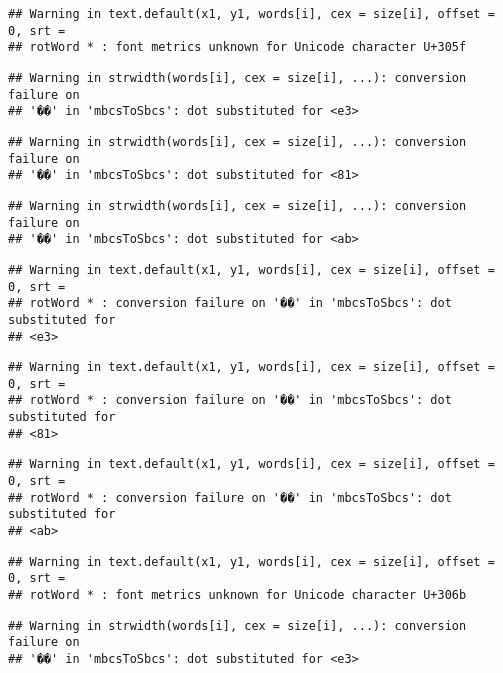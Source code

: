 \documentclass[]{article}
\begin{document}
\begin{verbatim}
## Warning in text.default(x1, y1, words[i], cex = size[i], offset = 0, srt =
## rotWord * : font metrics unknown for Unicode character U+305f
\end{verbatim}

\begin{verbatim}
## Warning in strwidth(words[i], cex = size[i], ...): conversion failure on
## '��' in 'mbcsToSbcs': dot substituted for <e3>
\end{verbatim}

\begin{verbatim}
## Warning in strwidth(words[i], cex = size[i], ...): conversion failure on
## '��' in 'mbcsToSbcs': dot substituted for <81>
\end{verbatim}

\begin{verbatim}
## Warning in strwidth(words[i], cex = size[i], ...): conversion failure on
## '��' in 'mbcsToSbcs': dot substituted for <ab>
\end{verbatim}

\begin{verbatim}
## Warning in text.default(x1, y1, words[i], cex = size[i], offset = 0, srt =
## rotWord * : conversion failure on '��' in 'mbcsToSbcs': dot substituted for
## <e3>
\end{verbatim}

\begin{verbatim}
## Warning in text.default(x1, y1, words[i], cex = size[i], offset = 0, srt =
## rotWord * : conversion failure on '��' in 'mbcsToSbcs': dot substituted for
## <81>
\end{verbatim}

\begin{verbatim}
## Warning in text.default(x1, y1, words[i], cex = size[i], offset = 0, srt =
## rotWord * : conversion failure on '��' in 'mbcsToSbcs': dot substituted for
## <ab>
\end{verbatim}

\begin{verbatim}
## Warning in text.default(x1, y1, words[i], cex = size[i], offset = 0, srt =
## rotWord * : font metrics unknown for Unicode character U+306b
\end{verbatim}

\begin{verbatim}
## Warning in strwidth(words[i], cex = size[i], ...): conversion failure on
## '��' in 'mbcsToSbcs': dot substituted for <e3>
\end{verbatim}
\end{document}
